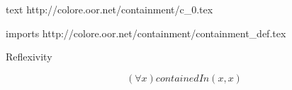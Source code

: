 text http://colore.oor.net/containment/c_0.tex

imports http://colore.oor.net/containment/containment_def.tex

Reflexivity

\begin{equation}
(\forall x) containedIn(x,x)
\end{equation}
